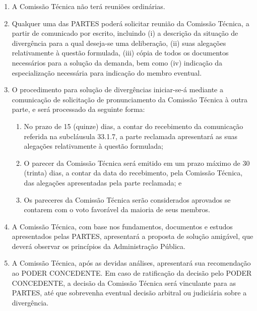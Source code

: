 \documentclass[a4paper,11pt]{report} %
\begin{document}
\begin{enumerate}
\begin{enumerate}[label*=\arabic*.]
\item \label{itm:YCE4} A Comissão Técnica não terá reuniões ordinárias. 

\item \label{itm:29RX} Qualquer uma das PARTES poderá solicitar reunião da Comissão Técnica, a partir de comunicado por escrito, incluindo (i) a descrição da situação de divergência para a qual deseja-se uma deliberação, (ii) suas alegações relativamente à questão formulada, (iii) cópia de todos os documentos necessários para a solução da demanda, bem como (iv) indicação da especialização necessária para indicação do membro eventual.

\item \label{itm:DQPV} O procedimento para solução de divergências iniciar-se-á mediante a comunicação de solicitação de pronunciamento da Comissão Técnica à outra parte, e será processado da seguinte forma:

\begin{enumerate}[label*=\arabic*.]
\item \label{itm:T8DK} No prazo de 15 (quinze) dias, a contar do recebimento da comunicação referida na subcláusula 33.1.7, a parte reclamada apresentará as suas alegações relativamente à questão formulada;

\item \label{itm:QWUD} O parecer da Comissão Técnica será emitido em um prazo máximo de 30 (trinta) dias, a contar da data do recebimento, pela Comissão Técnica, das alegações apresentadas pela parte reclamada; e

\item \label{itm:Q7NU} Os pareceres da Comissão Técnica serão considerados aprovados se contarem com o voto favorável da maioria de seus membros.
\end{enumerate}

\item \label{itm:32GX} A Comissão Técnica, com base nos fundamentos, documentos e estudos apresentados pelas PARTES, apresentará a proposta de solução amigável, que deverá observar os princípios da Administração Pública.

\item \label{itm:M3AL} A Comissão Técnica, após as devidas análises, apresentará sua recomendação ao PODER CONCEDENTE. Em caso de ratificação da decisão pelo PODER CONCEDENTE, a decisão da Comissão Técnica será vinculante para as PARTES, até que sobrevenha eventual decisão arbitral ou judiciária sobre a divergência.


\end{enumerate}
\end{enumerate}
\end{document}
